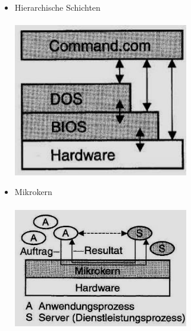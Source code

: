\begin{minipage}{0.3\textwidth}        
    \begin{itemize}
        \item Hierarchische Schichten\\\\
        \includegraphics[width=0.6\textwidth]{images/Betriebssysteme/Hierarchische_Schichten.png}
        \item Mikrokern\\\\
        \includegraphics[width=0.6\textwidth]{images/Betriebssysteme/Mikrokern.png} \\ \\ \\
    \end{itemize}
\end{minipage}
\hfill
